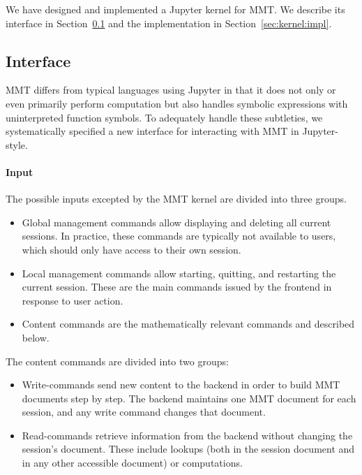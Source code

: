 
We have designed and implemented a Jupyter kernel for MMT.
We describe its interface in Section~\ref{sec:kernel:syntax} and the implementation in Section~\ref{sec:kernel:impl}.

\subsection{Interface}\label{sec:kernel:syntax}

MMT differs from typical languages using Jupyter in that it does not only or even primarily perform computation but also handles symbolic expressions with uninterpreted function symbols.
To adequately handle these subtleties, we systematically specified a new interface for interacting with MMT in Jupyter-style.

\paragraph{Input}
The possible inputs excepted by the MMT kernel are divided into three groups.
\begin{itemize}
\item Global management commands allow displaying and deleting all current sessions.
 In practice, these commands are typically not available to users, which should only have access to their own session.
\item Local management commands allow starting, quitting, and restarting the current session. These are the main commands issued by the frontend in response to user action.
\item Content commands are the mathematically relevant commands and described below.
\end{itemize}

The content commands are divided into two groups:
\begin{itemize}
 \item Write-commands send new content to the backend in order to build MMT documents step by step.
   The backend maintains one MMT document for each session, and any write command changes that document.
 \item Read-commands retrieve information from the backend without changing the session's document.
   These include lookups (both in the session document and in any other accessible document) or computations.
\end{itemize}

